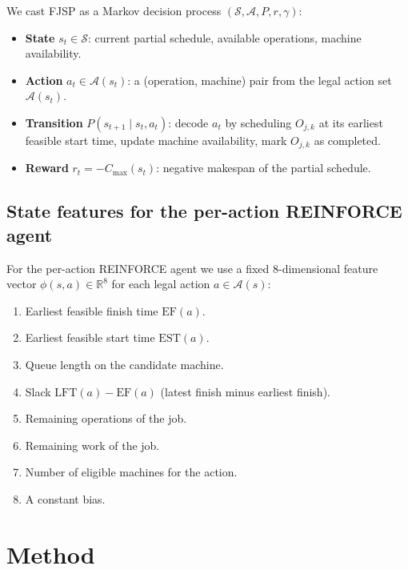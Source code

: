 \documentclass[preprint,review,3p,times,twocolumn]{elsarticle}
\newcommand{\reals}{\mathbb{R}}
\begin{document}
We cast FJSP as a Markov decision process
$(\mathcal{S}, \mathcal{A}, P, r, \gamma)$:
\begin{itemize}
  \item \textbf{State} $s_t \in \mathcal{S}$: current
        partial schedule, available operations, machine
        availability.
  \item \textbf{Action} $a_t \in \mathcal{A}(s_t)$: a
        (operation, machine) pair from the legal action set
        $\mathcal{A}(s_t)$.
  \item \textbf{Transition} $P(s_{t+1} \mid s_t, a_t)$:
        decode $a_t$ by scheduling $O_{j,k}$ at its
        earliest feasible start time, update machine
        availability, mark $O_{j,k}$ as completed.
  \item \textbf{Reward} $r_t = -C_{\max}(s_t)$: negative
        makespan of the partial schedule.
\end{itemize}

\subsection{State features for the per-action REINFORCE agent}

For the per-action REINFORCE agent we use a fixed
8-dimensional feature vector $\phi(s, a) \in \reals^8$ for
each legal action $a \in \mathcal{A}(s)$:
\begin{enumerate}[leftmargin=*]
  \item Earliest feasible finish time $\mathrm{EF}(a)$.
  \item Earliest feasible start time $\mathrm{EST}(a)$.
  \item Queue length on the candidate machine.
  \item Slack $\mathrm{LFT}(a) - \mathrm{EF}(a)$ (latest
        finish minus earliest finish).
  \item Remaining operations of the job.
  \item Remaining work of the job.
  \item Number of eligible machines for the action.
  \item A constant bias.
\end{enumerate}

\section{Method}
\label{sec:method}
\end{document}

